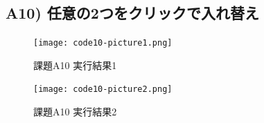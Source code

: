 \documentclass[a4paper,11pt,titlepage]{jsarticle}
\begin{document}
\subsection{A10) 任意の2つをクリックで入れ替え}

\begin{figure}[H]
  \centering
  \texttt{[image: code10-picture1.png]}
  \caption{課題A10 実行結果1}
\end{figure}
\begin{figure}[H]
  \centering
  \texttt{[image: code10-picture2.png]}
  \caption{課題A10 実行結果2}
\end{figure}
\end{document}
